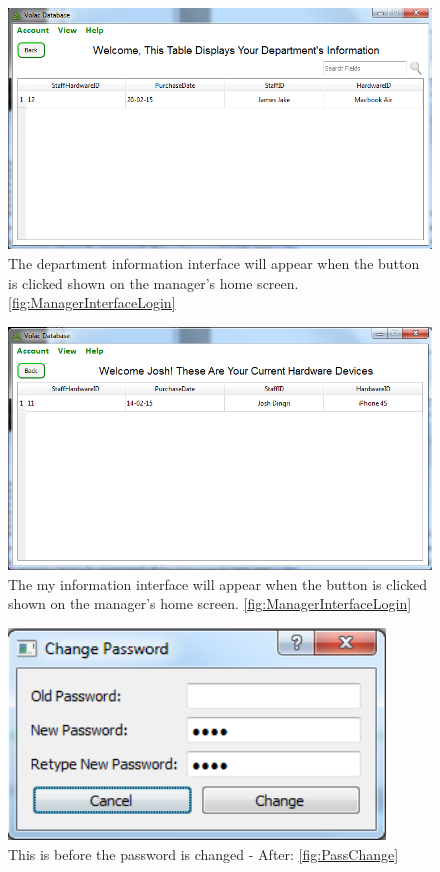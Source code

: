 \begin{figure}[H]
    \includegraphics[width=\textwidth]{./Testing/Images/DepartmentInformation.png}
    \caption{The department information interface will appear when the button is clicked shown on the manager's home screen. \ref{fig:ManagerInterfaceLogin} } \label{fig:DepartmentInformation}
\end{figure}

\begin{figure}[H]
    \includegraphics[width=\textwidth]{./Testing/Images/MyInformation.png}
    \caption{The my information interface will appear when the button is clicked shown on the manager's home screen. \ref{fig:ManagerInterfaceLogin} } \label{fig:MyInformation}
\end{figure}

\begin{figure}[H]
    \includegraphics[width=100mm,scale=1]{./Testing/Images/ChangePasswordWindow.png}
    \caption{This is before the password is changed - After: \ref{fig:PassChange}} \label{fig:ChangePasswordWindow}
\end{figure}

